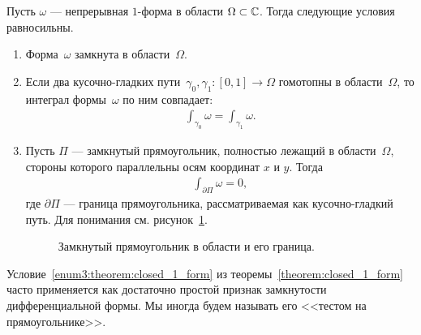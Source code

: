 \documentclass[../complex-analysis.tex]{subfiles}
\begin{document}
\begin{thm}
 \label{theorem:closed_1_form}
 Пусть $\omega$ --- непрерывная $1$-форма в области $\Omega \subset \mathbb{C}$. Тогда следующие условия равносильны.
 \begin{enumerate}
  \item \label{enum1:theorem:closed_1_form} Форма~$\omega$ замкнута в области~$\Omega$.
  \item \label{enum2:theorem:closed_1_form} Если два кусочно-гладких пути~$\gamma_0, \gamma_1 \colon [0,1] \to \Omega$ гомотопны в области~$\Omega$, то интеграл формы~$ \omega $ по ним совпадает:
   \begin{align*}
    \int_{\gamma_0} \omega = \int_{\gamma_1} \omega.
   \end{align*}
  \item \label{enum3:theorem:closed_1_form} Пусть $\Pi$ --- замкнутый прямоугольник, полностью лежащий в области~$\Omega$, стороны которого параллельны осям координат $ x $ и $ y $. Тогда
   \begin{align*}
    \int_{\partial \Pi} \omega = 0,
   \end{align*} где $ \partial\Pi $ --- граница прямоугольника, рассматриваемая как кусочно-гладкий путь. Для понимания см. рисунок~\ref{fig:closed-rectangle-and-its-border}.
   \begin{figure}[ht]
    \centering
    \caption{Замкнутый прямоугольник в области и его граница.}
    \label{fig:closed-rectangle-and-its-border}
   \end{figure}
 \end{enumerate}
\end{thm}
\begin{remrk*}
 Условие~\ref{enum3:theorem:closed_1_form} из теоремы~\ref{theorem:closed_1_form} часто применяется как достаточно простой признак замкнутости дифференциальной формы. Мы иногда будем называть его <<тестом на прямоугольнике>>.
\end{remrk*}
\end{document}
